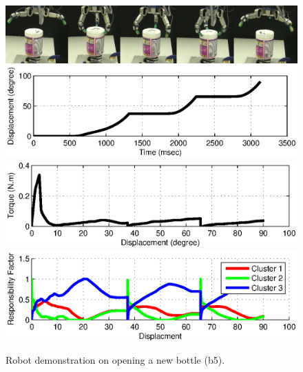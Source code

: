 \begin{figure}
  \centering
  \includegraphics[width=15cm]{./fig_cha4/demo_b5.jpg}
  \includegraphics[width=15cm]{./fig_cha4/demo_b5_s.eps}
  \includegraphics[width=15cm]{./fig_cha4/demo_b5_T.eps}
  \includegraphics[width=15cm]{./fig_cha4/demo_b5_rf.eps}
  \caption{ \scriptsize{Robot demonstration on opening a new bottle (b5).}
}
\label{fig:demo_b5}
\end{figure}

